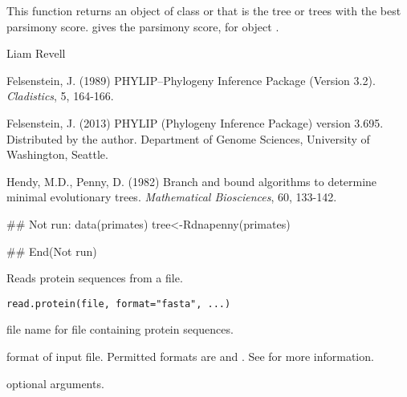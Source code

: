 \documentclass[a4paper]{book}
\begin{document}
%
\begin{Value}
This function returns an object of class  or  that is the tree or trees with the best parsimony score.  gives the parsimony score, for  object .
\end{Value}
%
\begin{Author}\relax
Liam Revell 
\end{Author}
%
\begin{References}\relax
Felsenstein, J. (1989) PHYLIP--Phylogeny Inference Package (Version 3.2). \emph{Cladistics}, 5, 164-166.

Felsenstein, J. (2013) PHYLIP (Phylogeny Inference Package) version 3.695. Distributed by the author. Department of Genome Sciences, University of Washington, Seattle.

Hendy, M.D., Penny, D. (1982) Branch and bound algorithms to determine minimal evolutionary trees. \emph{Mathematical Biosciences}, 60, 133-142.
\end{References}
%
\begin{SeeAlso}\relax
{}
\end{SeeAlso}
%
\begin{Examples}
\begin{ExampleCode}
## Not run: 
data(primates)
tree<-Rdnapenny(primates)

## End(Not run)
\end{ExampleCode}
\end{Examples}
%
\begin{Description}\relax
Reads protein sequences from a file.
\end{Description}
%
\begin{Usage}
\begin{verbatim}
read.protein(file, format="fasta", ...)
\end{verbatim}
\end{Usage}
%
\begin{Arguments}
\begin{ldescription}
\item[\code{file}] file name for file containing protein sequences.
\item[\code{format}] format of input file. Permitted formats are  and . See  for more information.
\item[\code{...}] optional arguments.
\end{ldescription}
\end{Arguments}
\end{document}

